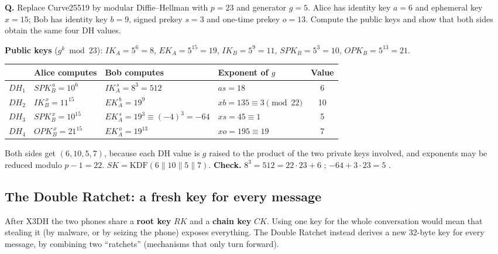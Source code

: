\begin{worked}
\textbf{Q.} Replace Curve25519 by modular Diffie--Hellman with $p = 23$ and generator $g = 5$. Alice has identity key $a = 6$ and ephemeral key $x = 15$; Bob has identity key $b = 9$, signed prekey $s = 3$ and one-time prekey $o = 13$. Compute the public keys and show that both sides obtain the same four DH values.

\textbf{Public keys} ($g^k \bmod 23$): $IK_A = 5^6 = 8$, $EK_A = 5^{15} = 19$, $IK_B = 5^9 = 11$, $SPK_B = 5^3 = 10$, $OPK_B = 5^{13} = 21$.
\begin{center}\small
\begin{tabular}{@{}llllc@{}}
\toprule
 & Alice computes & Bob computes & Exponent of $g$ & Value\\
\midrule
$DH_1$ & $SPK_B^{\,a} = 10^6$ & $IK_A^{\,s} = 8^3 = 512$ & $as = 18$ & 6\\
$DH_2$ & $IK_B^{\,x} = 11^{15}$ & $EK_A^{\,b} = 19^9$ & $xb = 135 \equiv 3 \pmod{22}$ & 10\\
$DH_3$ & $SPK_B^{\,x} = 10^{15}$ & $EK_A^{\,s} = 19^3 \equiv (-4)^3 = -64$ & $xs = 45 \equiv 1$ & 5\\
$DH_4$ & $OPK_B^{\,x} = 21^{15}$ & $EK_A^{\,o} = 19^{13}$ & $xo = 195 \equiv 19$ & 7\\
\bottomrule
\end{tabular}
\end{center}
Both sides get $(6, 10, 5, 7)$, because each DH value is $g$ raised to the product of the two private keys involved, and exponents may be reduced modulo $p - 1 = 22$. $SK = \mathrm{KDF}(6 \| 10 \| 5 \| 7)$. \textbf{Check.} $8^3 = 512 = 22 \cdot 23 + 6$ \checkmark; $-64 + 3 \cdot 23 = 5$ \checkmark.
\end{worked}

\subsection{The Double Ratchet: a fresh key for every message \hot\new}

After X3DH the two phones share a \textbf{root key} $RK$ and a \textbf{chain key} $CK$. Using one key for the whole conversation would mean that stealing it (by malware, or by seizing the phone) exposes everything. The Double Ratchet instead derives a new 32-byte key for every message, by combining two ``ratchets'' (mechanisms that only turn forward).

